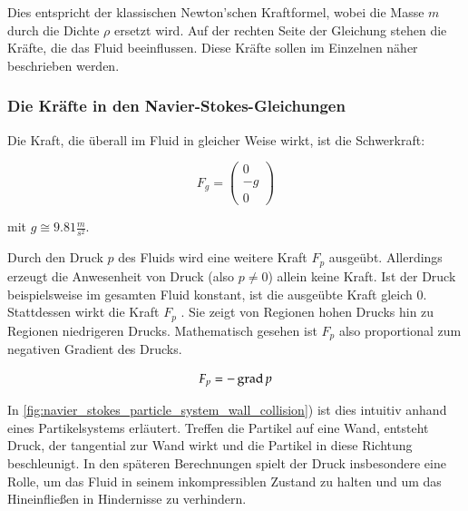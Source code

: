 Dies entspricht der klassischen Newton'schen Kraftformel, wobei die
Masse $m$ durch die Dichte $\rho$ ersetzt wird. Auf der rechten Seite
der Gleichung stehen die Kräfte, die das Fluid beeinflussen. Diese
Kräfte sollen im Einzelnen näher beschrieben werden.

\subsubsection{Die Kräfte in den Navier-Stokes-Gleichungen}

Die Kraft, die überall im Fluid in gleicher Weise wirkt, ist die Schwerkraft:

\begin{equation}
F_g =
\left(
\begin{array}{c}
0 \\
-g \\
0
\end{array}
\right)
\end{equation}

mit $g \cong 9.81 \frac{m}{s^2}$.

Durch den Druck $p$ des Fluids wird eine weitere Kraft $F_p$ ausgeübt.
Allerdings erzeugt die Anwesenheit von Druck (also $p \neq 0$) allein
keine Kraft. Ist der Druck beispielsweise im gesamten Fluid konstant,
ist die ausgeübte Kraft gleich 0. Stattdessen wirkt die Kraft $F_p$
. Sie zeigt von Regionen hohen Drucks hin
zu Regionen niedrigeren Drucks. Mathematisch gesehen ist $F_p$ also
proportional zum negativen Gradient des Drucks.

\begin{equation}
\label{eq:navier_stokes_f_p}
F_p = -\operatorname*{grad} p
\end{equation}

 In \autoref{fig:navier_stokes_particle_system_wall_collision}) ist
dies intuitiv anhand eines Partikelsystems erläutert. Treffen die
Partikel auf eine Wand, entsteht Druck, der tangential zur Wand wirkt
und die Partikel in diese Richtung beschleunigt. In den späteren
Berechnungen spielt der Druck insbesondere eine Rolle, um das Fluid in
seinem inkompressiblen Zustand zu halten und um das Hineinfließen in
Hindernisse zu verhindern.

